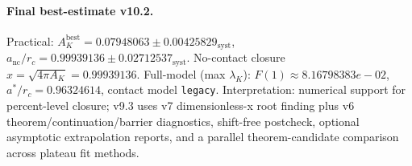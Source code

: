 \paragraph{Final best-estimate v10.2.}
Practical: $A_K^{\mathrm{best}} = 0.07948063 \pm 0.00425829_{\mathrm{syst}}$, $a_{\mathrm{nc}}/r_c = 0.99939136 \pm 0.02712537_{\mathrm{syst}}$.
No-contact closure $x = \sqrt{4\pi A_K} = 0.99939136$.
Full-model (max $\lambda_K$): $F(1) \approx 8.16798383e-02$, $a^*/r_c = 0.96324614$, contact model \texttt{legacy}.
Interpretation: numerical support for percent-level closure; v9.3 uses v7 dimensionless-x root finding plus v6 theorem/continuation/barrier diagnostics, shift-free postcheck, optional asymptotic extrapolation reports, and a parallel theorem-candidate comparison across plateau fit methods.
